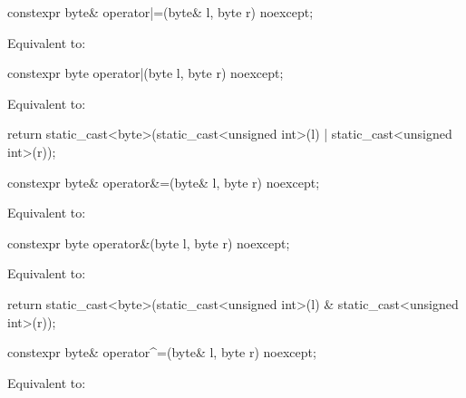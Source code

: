 %
\begin{itemdecl}
constexpr byte& operator|=(byte& l, byte r) noexcept;
\end{itemdecl}

\begin{itemdescr}
\pnum
\effects
Equivalent to: 
\end{itemdescr}

%
\begin{itemdecl}
constexpr byte operator|(byte l, byte r) noexcept;
\end{itemdecl}

\begin{itemdescr}
\pnum
\effects
Equivalent to:
\begin{codeblock}
return static_cast<byte>(static_cast<unsigned int>(l) | static_cast<unsigned int>(r));
\end{codeblock}
\end{itemdescr}

%
\begin{itemdecl}
constexpr byte& operator&=(byte& l, byte r) noexcept;
\end{itemdecl}

\begin{itemdescr}
\pnum
\effects
Equivalent to: 
\end{itemdescr}

%
\begin{itemdecl}
constexpr byte operator&(byte l, byte r) noexcept;
\end{itemdecl}

\begin{itemdescr}
\pnum
\effects
Equivalent to:
\begin{codeblock}
return static_cast<byte>(static_cast<unsigned int>(l) & static_cast<unsigned int>(r));
\end{codeblock}
\end{itemdescr}

%
\begin{itemdecl}
constexpr byte& operator^=(byte& l, byte r) noexcept;
\end{itemdecl}

\begin{itemdescr}
\pnum
\effects
Equivalent to: 
\end{itemdescr}

